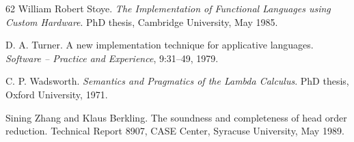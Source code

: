 \begin{thebibliography}{62}
William Robert Stoye.
\emph{The Implementation of Functional Languages using Custom Hardware}.
PhD thesis, Cambridge University, May 1985.

D. A. Turner.
A new implementation technique for applicative languages.
\emph{Software -- Practice and Experience}, 9:31--49, 1979.

C. P. Wadsworth.
\emph{Semantics and Pragmatics of the Lambda Calculus}.
PhD thesis, Oxford University, 1971.

Sining Zhang and Klaus Berkling.
The soundness and completeness of head order reduction.
Technical Report 8907, CASE Center, Syracuse University, May 1989.

\end{thebibliography}
